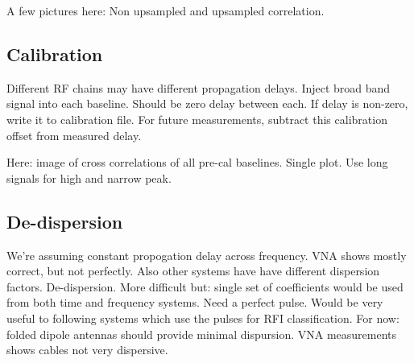 A few pictures here:
Non upsampled and upsampled correlation.

\subsection{Calibration}
Different RF chains may have different propagation delays. 
Inject broad band signal into each baseline. Should be zero delay between each. 
If delay is non-zero, write it to calibration file.
For future measurements, subtract this calibration offset from measured delay. 

Here: image of cross correlations of all pre-cal baselines. Single plot. Use long signals for high and narrow peak.

\subsection{De-dispersion}
We're assuming constant propogation delay across frequency. VNA shows mostly correct, but not perfectly. Also other systems have have different dispersion factors. 
De-dispersion. 
More difficult but: single set of coefficients would be used from both time and frequency systems. 
Need a perfect pulse.
Would be very useful to following systems which use the pulses for RFI classification. 
For now: folded dipole antennas should provide minimal dispursion. 
VNA measurements shows cables not very dispersive.
